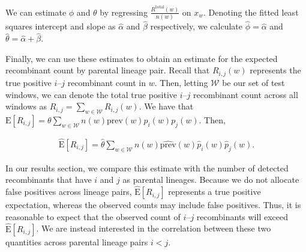\documentclass[11pt,oneside,letterpaper]{article}
\begin{document}
We can estimate $\phi$ and $\theta$ by regressing $\frac{R^{\mathrm{total}}(w)}{n(w)}$ on $x_w$. Denoting the fitted least squares intercept and slope as $\hat\alpha$ and $\hat\beta$ respectively, we calculate $\hat\phi = \hat\alpha$ and $\hat\theta = \hat\alpha + \hat\beta$. 

Finally, we can use these estimates to obtain an estimate for the expected recombinant count by parental lineage pair. Recall that $R_{i,j}(w)$ represents the true positive $i\text{--}j$ recombinant count in $w$. Then, letting $\mathcal{W}$ be our set of test windows, we can denote the total true positive $i\text{--}j$ recombinant count across all windows as $R_{i,j} = \sum_{w\in\mathcal{W}}R_{i,j}(w)$. We have that $\mathrm{E}\left[R_{i,j}\right] = \theta\sum_{w\in\mathcal{W}}n(w)\mathrm{prev}(w)p_i(w)p_j(w)$. Then,

\begin{align*}
\hat{\mathrm{E}}\left[R_{i,j}\right]
=  \hat \theta  \sum_{w\in\mathcal{W}} n(w)\widehat{\mathrm{prev}}(w)\hat p_i(w)\hat p_j(w).
\end{align*}

In our results section, we compare this estimate with the number of detected recombinants that have $i$ and $j$ as parental lineages. Because we do not allocate false positives across lineage pairs, $\hat{\mathrm{E}}[R_{i,j}]$ represents a true positive expectation, whereas the observed counts may include false positives. Thus, it is reasonable to expect that the observed count of $i\text{--}j$ recombinants will exceed $\hat{\mathrm{E}}[R_{i,j}]$. We are instead interested in the correlation between these two quantities across parental lineage pairs $i<j$.



\end{document}
